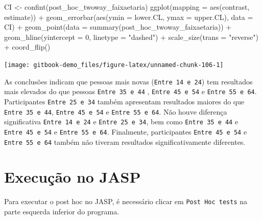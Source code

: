 \documentclass[
]{book}
\newenvironment{Shaded}{\begin{snugshade}}{\end{snugshade}}
\newcommand{\AttributeTok}[1]{\textcolor[rgb]{0.77,0.63,0.00}{#1}}
\newcommand{\DecValTok}[1]{\textcolor[rgb]{0.00,0.00,0.81}{#1}}
\newcommand{\FunctionTok}[1]{\textcolor[rgb]{0.00,0.00,0.00}{#1}}
\newcommand{\NormalTok}[1]{#1}
\newcommand{\OtherTok}[1]{\textcolor[rgb]{0.56,0.35,0.01}{#1}}
\newcommand{\SpecialCharTok}[1]{\textcolor[rgb]{0.00,0.00,0.00}{#1}}
\newcommand{\StringTok}[1]{\textcolor[rgb]{0.31,0.60,0.02}{#1}}
\begin{document}
\begin{Shaded}
\begin{Highlighting}[]
\NormalTok{CI }\OtherTok{\textless{}{-}} \FunctionTok{confint}\NormalTok{(post\_hoc\_twoway\_faixaetaria)}
\FunctionTok{ggplot}\NormalTok{(}\AttributeTok{mapping =} \FunctionTok{aes}\NormalTok{(contrast, estimate)) }\SpecialCharTok{+}
  \FunctionTok{geom\_errorbar}\NormalTok{(}\FunctionTok{aes}\NormalTok{(}\AttributeTok{ymin =}\NormalTok{ lower.CL, }\AttributeTok{ymax =}\NormalTok{ upper.CL), }\AttributeTok{data =}\NormalTok{ CI) }\SpecialCharTok{+}
  \FunctionTok{geom\_point}\NormalTok{(}\AttributeTok{data =} \FunctionTok{summary}\NormalTok{(post\_hoc\_twoway\_faixaetaria)) }\SpecialCharTok{+}
  \FunctionTok{geom\_hline}\NormalTok{(}\AttributeTok{yintercept =} \DecValTok{0}\NormalTok{, }\AttributeTok{linetype =} \StringTok{"dashed"}\NormalTok{) }\SpecialCharTok{+} 
  \FunctionTok{scale\_size}\NormalTok{(}\AttributeTok{trans =} \StringTok{"reverse"}\NormalTok{) }\SpecialCharTok{+} 
  \FunctionTok{coord\_flip}\NormalTok{()}
\end{Highlighting}
\end{Shaded}

\begin{center}\texttt{[image: gitbook-demo\_files/figure-latex/unnamed-chunk-106-1]} \end{center}

As conclusões indicam que pessoas mais novas (\texttt{Entre\ 14\ e\ 24}) tem resultados mais elevados do que pessoas \texttt{Entre\ 35\ e\ 44} , \texttt{Entre\ 45\ e\ 54} e \texttt{Entre\ 55\ e\ 64}. Participantes \texttt{Entre\ 25\ e\ 34} também apresentam resultados maiores do que \texttt{Entre\ 35\ e\ 44}, \texttt{Entre\ 45\ e\ 54} e \texttt{Entre\ 55\ e\ 64}. Não houve diferença significativa \texttt{Entre\ 14\ e\ 24} e \texttt{Entre\ 25\ e\ 34}, bem como \texttt{Entre\ 35\ e\ 44} e \texttt{Entre\ 45\ e\ 54} e \texttt{Entre\ 55\ e\ 64}. Finalmente, participantes \texttt{Entre\ 45\ e\ 54} e \texttt{Entre\ 55\ e\ 64} também não tiveram resultados significativamente diferentes.

\hypertarget{execuuxe7uxe3o-no-jasp-9}{%
\section{Execução no JASP}\label{execuuxe7uxe3o-no-jasp-9}}

Para executar o post hoc no JASP, é necessário clicar em \texttt{Post\ Hoc\ tests} na parte esquerda inferior do programa.
\end{document}
